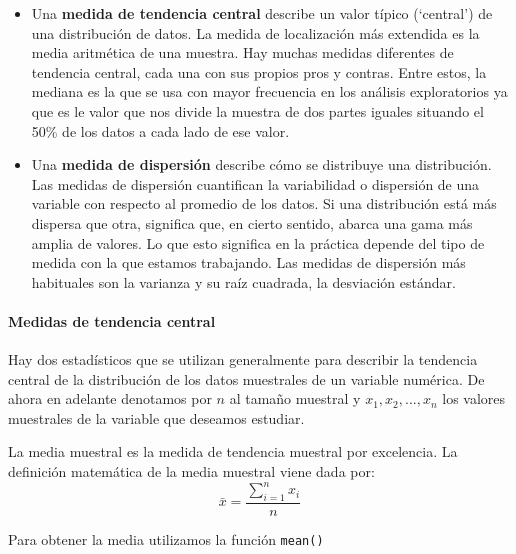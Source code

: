 \documentclass[
]{book}
\newenvironment{Shaded}{\begin{snugshade}}{\end{snugshade}}
\newcommand{\FunctionTok}[1]{\textcolor[rgb]{0.00,0.00,0.00}{#1}}
\newcommand{\NormalTok}[1]{#1}
\newcommand{\SpecialCharTok}[1]{\textcolor[rgb]{0.00,0.00,0.00}{#1}}
\providecommand{\tightlist}{%
  \setlength{\itemsep}{0pt}\setlength{\parskip}{0pt}}
\begin{document}
\begin{itemize}
\tightlist
\item
  Una \textbf{medida de tendencia central} describe un valor típico (`central') de una distribución de datos. La medida de localización más extendida es la media aritmética de una muestra. Hay muchas medidas diferentes de tendencia central, cada una con sus propios pros y contras. Entre estos, la mediana es la que se usa con mayor frecuencia en los análisis exploratorios ya que es le valor que nos divide la muestra de dos partes iguales situando el 50\% de los datos a cada lado de ese valor.
\item
  Una \textbf{medida de dispersión} describe cómo se distribuye una distribución. Las medidas de dispersión cuantifican la variabilidad o dispersión de una variable con respecto al promedio de los datos. Si una distribución está más dispersa que otra, significa que, en cierto sentido, abarca una gama más amplia de valores. Lo que esto significa en la práctica depende del tipo de medida con la que estamos trabajando. Las medidas de dispersión más habituales son la varianza y su raíz cuadrada, la desviación estándar.
\end{itemize}

\hypertarget{medidas-de-tendencia-central}{%
\paragraph{Medidas de tendencia central}\label{medidas-de-tendencia-central}}

Hay dos estadísticos que se utilizan generalmente para describir la tendencia central de la distribución de los datos muestrales de un variable numérica. De ahora en adelante denotamos por \(n\) al tamaño muestral y \(x_1, x_2,...,x_n\) los valores muestrales de la variable que deseamos estudiar.

La media muestral es la medida de tendencia muestral por excelencia. La definición matemática de la media muestral viene dada por: \begin{equation} 
  \bar{x} = \frac{\sum_{i=1}^n x_i}{n}
  \label{eq:samplemean}
\end{equation}

Para obtener la media utilizamos la función \texttt{mean()}

\begin{Shaded}
\end{Shaded}
\end{document}
